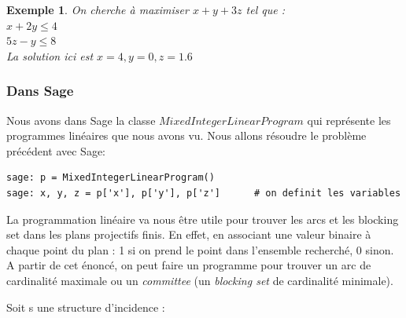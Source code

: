 \documentclass[a4paper]{article}
\newtheorem{Ex}{Exemple}[subsection]
\begin{document}
\begin{Ex}
  On cherche à maximiser $x + y + 3z$ tel que : \\
  $x + 2y \leq 4$\\
  $5z - y \leq 8$\\
  La solution ici est $x = 4, y = 0, z = 1.6$
\end{Ex}

\subsubsection{Dans Sage}
Nous avons dans Sage la classe $MixedIntegerLinearProgram$ qui représente les programmes linéaires que nous avons vu.
Nous allons résoudre le problème précédent avec Sage:
\begin{lstlisting}
sage: p = MixedIntegerLinearProgram()
sage: x, y, z = p['x'], p['y'], p['z']      # on definit les variables
\end{lstlisting}









La programmation linéaire va nous être utile pour trouver les arcs et les blocking set dans les plans projectifs finis. En effet, en associant une valeur binaire à chaque point du plan : 1 si on prend le point dans l'ensemble recherché, 0 sinon.\\
A partir de cet énoncé, on peut faire un programme pour trouver un arc de cardinalité maximale ou un \textit{committee} (un \textit{blocking set} de cardinalité minimale).

Soit s une structure d'incidence :
\end{document}
